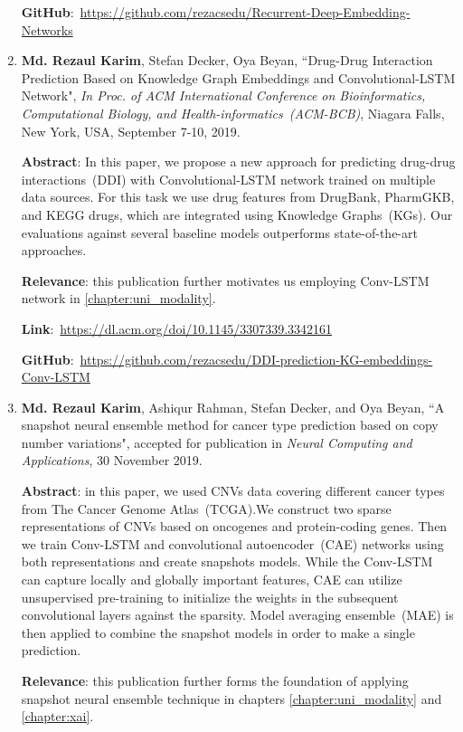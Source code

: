 \begin{enumerate}
	\textbf{GitHub}:~\url{https://github.com/rezacsedu/Recurrent-Deep-Embedding-Networks}
	
	\item \textbf{Md. Rezaul Karim}, Stefan Decker, Oya Beyan, ``Drug-Drug Interaction Prediction Based on Knowledge Graph Embeddings and Convolutional-LSTM Network", \emph{In Proc. of ACM International Conference on Bioinformatics, Computational Biology, and Health-informatics~(ACM-BCB)}, Niagara Falls, New York, USA, September 7-10, 2019.
	
	\textbf{Abstract}: In this paper, we propose a new approach for predicting drug-drug interactions~(DDI) with Convolutional-LSTM network trained on multiple data sources. For this task we use drug features from DrugBank, PharmGKB, and KEGG drugs, which are integrated using Knowledge Graphs~(KGs). Our evaluations against several baseline models outperforms state-of-the-art approaches. 
	
	\textbf{Relevance}: this publication further motivates us employing Conv-LSTM network in \cref{chapter:uni_modality}.
	
	\textbf{Link}:~\url{https://dl.acm.org/doi/10.1145/3307339.3342161}

	\textbf{GitHub}:~\url{https://github.com/rezacsedu/DDI-prediction-KG-embeddings-Conv-LSTM}
	
	\item \textbf{Md. Rezaul Karim}, Ashiqur Rahman, Stefan Decker, and Oya Beyan, ``A snapshot neural ensemble method for cancer type prediction based on copy number variations", accepted for publication in \emph{Neural Computing and Applications}, 30 November 2019. 
	
	\textbf{Abstract}: in this paper, we used CNVs data covering different cancer types from The Cancer Genome Atlas~(TCGA).We construct two sparse representations of CNVs based on oncogenes and protein-coding genes. Then we train Conv-LSTM and convolutional autoencoder~(CAE) networks using both representations and create snapshots models. While the Conv-LSTM can capture locally and globally important features, CAE can utilize unsupervised pre-training to initialize the weights in the subsequent convolutional layers against the sparsity. Model averaging ensemble~(MAE) is then applied to combine the snapshot models in order to make a single prediction. 
	
	\textbf{Relevance}: this publication further forms the foundation of applying snapshot neural ensemble technique in chapters \ref{chapter:uni_modality} and \ref{chapter:xai}.
	

\end{enumerate}
